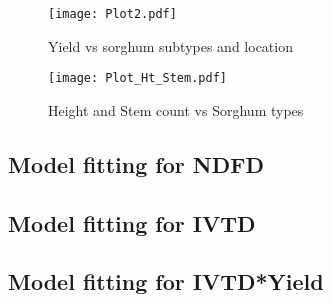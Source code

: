 \begin{figure}[H]
\centering
\texttt{[image: Plot2.pdf]}
\caption{Yield vs sorghum subtypes and location}
\label{fig:Fig4}
\end{figure}

\begin{figure}[H]
\centering
\texttt{[image: Plot\_Ht\_Stem.pdf]}
\caption{Height and Stem count vs Sorghum types}
\label{fig:Fig5}
\end{figure}

\subsection*{Model fitting for NDFD}

\subsection*{Model fitting for IVTD}

\subsection*{Model fitting for IVTD*Yield}



